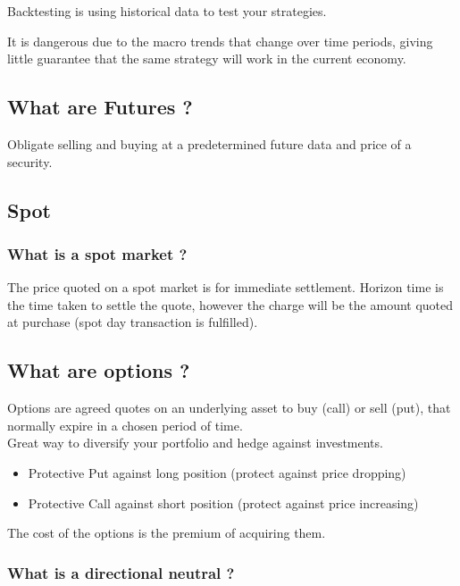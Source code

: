 \documentclass[11pt]{scrartcl} %
\begin{document}
Backtesting is using historical data to test your strategies.

It is dangerous due to the macro trends that change over time periods, giving little guarantee that
the same strategy will work in the current economy. 

\subsection{What are Futures ?}

Obligate selling and buying at a predetermined future data and price of a security.

\subsection{Spot}

\subsubsection{What is a spot market ?}

The price quoted on a spot market is for immediate settlement. Horizon time is the time taken to settle
the quote, however the charge will be the amount quoted at purchase (spot day transaction is fulfilled).

\subsection{What are options ?}

Options are agreed quotes on an underlying asset to buy (call) or sell (put), that normally expire in
a chosen period of time.\\

Great way to diversify your portfolio and hedge against investments.

\begin{itemize}
	\item Protective Put against long position (protect against price dropping)
	\item Protective Call against short position (protect against price increasing)
\end{itemize}
The cost of the options is the premium of acquiring them.

\subsubsection{What is a directional neutral ?}
\end{document}
